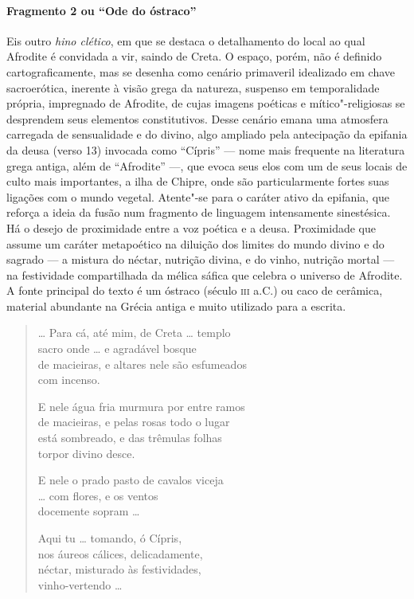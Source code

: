 \paragraph{Fragmento 2 ou “Ode do óstraco”}

{\small Eis outro \textit{hino clético}, em que se destaca o detalhamento do local ao
qual Afrodite é convidada a vir, saindo de Creta. O espaço, porém, não é
definido cartograficamente, mas se desenha como cenário primaveril idealizado
em chave sacroerótica, inerente à visão grega da natureza, suspenso em
temporalidade própria, impregnado de Afrodite, de cujas imagens poéticas e
mítico"-religiosas se desprendem seus elementos constitutivos. Desse cenário
emana uma atmosfera carregada de sensualidade e do divino, algo ampliado pela
antecipação da epifania da deusa (verso 13) invocada como ``Cípris'' ---
nome mais frequente na literatura grega antiga, além de “Afrodite” ---, que evoca
seus elos com um de seus locais de culto mais importantes, a ilha de Chipre,
onde são particularmente fortes suas ligações com o mundo vegetal. Atente"-se
para o caráter ativo da epifania, que reforça a ideia da fusão num fragmento de
linguagem intensamente sinestésica. Há o desejo de proximidade
entre a voz poética e a deusa. Proximidade que assume um caráter metapoético na diluição dos limites do mundo divino e do sagrado --- a mistura do néctar, nutrição divina, e do vinho, nutrição mortal --- na festividade compartilhada da mélica sáfica que celebra o universo de Afrodite. A fonte principal do texto é um óstraco (século \textsc{iii} a.C.) ou caco de cerâmica, material abundante na Grécia antiga e muito utilizado para a
escrita.}

\begin{verse}
\ldots{} Para cá, até mim, de Creta \ldots{} templo\\
sacro onde \ldots{} e agradável bosque\\
de macieiras, e altares nele são esfumeados\\
com incenso.

E nele água fria murmura por entre ramos\\
de macieiras, e pelas rosas todo o lugar\\
está sombreado, e das trêmulas folhas\\
torpor divino desce.

E nele o prado pasto de cavalos viceja\\
\ldots{} com flores, e os ventos\\
docemente sopram \ldots{}

Aqui tu \ldots{} tomando, ó Cípris,\\
nos áureos cálices, delicadamente,\\
néctar, misturado às festividades,\\
vinho-vertendo \ldots{}
\end{verse}

